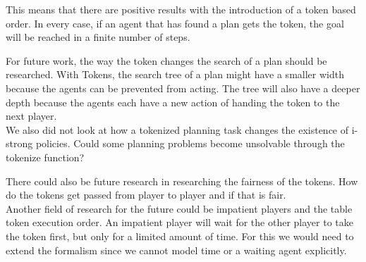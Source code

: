 This means that there are positive results with the introduction of a token based order. In every case, if an agent that has found a plan gets the token, the goal will be reached in a finite number of steps.

For future work, the way the token changes the search of a plan should be researched. With Tokens, the search tree of a plan might have a smaller width because the agents can be prevented from acting. The tree will also have a deeper depth because the agents each have a new action of handing the token to the next player.\\
We also did not look at how a tokenized planning task changes the existence of i-strong policies. Could some planning problems become unsolvable through the tokenize function?

There could also be future research in researching the fairness of the tokens. How do the tokens get passed from player to player and if that is fair. \\
Another field of research for the future could be impatient players and the table token execution order. An impatient player will wait for the other player to take the token first, but only for a limited amount of time. For this we would need to extend the formalism since we cannot model time or a waiting agent explicitly.
